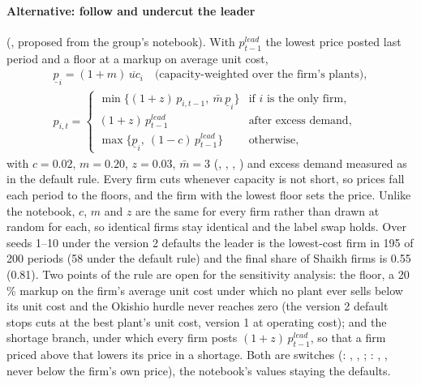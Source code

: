 \paragraph{Alternative: follow and undercut the leader} (, proposed from the group's notebook). With $p^{lead}_{t-1}$ the lowest price
posted last period and a floor at a markup on average unit cost,
\begin{gather*}
\underline p_{i} = (1+m)\,\overline{uc}_i \quad\text{(capacity-weighted over the firm's plants)}, \\
p_{i,t} =
\begin{cases}
\min\{(1+z)\,p_{i,t-1},\ \bar m\,\underline p_{i}\} & \text{if } i \text{ is the only firm}, \\
(1+z)\,p^{lead}_{t-1} & \text{after excess demand}, \\
\max\{\underline p_{i},\ (1-c)\,p^{lead}_{t-1}\} & \text{otherwise},
\end{cases}
\end{gather*}
with $c = 0.02$, $m = 0.20$, $z = 0.03$, $\bar m = 3$ (, ,
, ) and excess demand measured as in the default rule.
Every firm cuts whenever capacity is not short, so prices fall each period to the floors, and
the firm with the lowest floor sets the price. Unlike the notebook, $c$, $m$ and $z$ are the
same for every firm rather than drawn at random for each, so identical firms stay identical
and the label swap holds. Over seeds 1--10 under the version 2 defaults the leader is the
lowest-cost firm in 195 of 200 periods (58 under the default rule) and the final share of
Shaikh firms is 0.55 (0.81). Two points of the rule are open for the sensitivity analysis:
the floor, a 20\,\% markup on the firm's average unit cost under which no plant ever sells
below its unit cost and the Okishio hurdle never reaches zero (the version 2 default stops
cuts at the best plant's unit cost, version 1 at operating cost); and the shortage branch,
under which every firm posts $(1+z)\,p^{lead}_{t-1}$, so that a firm priced above that
lowers its price in a shortage. Both are switches (: ,
, ; : ,
, never below the firm's own price), the notebook's values staying the
defaults.

